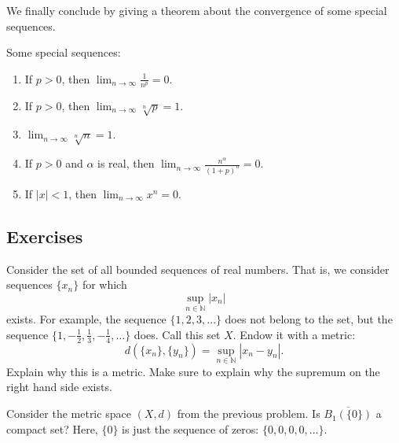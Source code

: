   We finally conclude by giving a theorem about the convergence of some special sequences. 

  \begin{theorem}
    Some special sequences: 
    \begin{enumerate}
      \item If $p > 0$, then $\lim_{n \rightarrow \infty} \frac{1}{n^p} = 0$. 
      
      \item If $p > 0$, then $\lim_{n \rightarrow \infty} \sqrt[n]{p} = 1$. 

      \item $\lim_{n \rightarrow \infty} \sqrt[n]{n} = 1$. 

      \item If $p > 0$ and $\alpha$ is real, then $\lim_{n \rightarrow \infty} \frac{n^\alpha}{(1 + p)^n} = 0$. 
      
      \item If $|x| < 1$, then $\lim_{n \rightarrow \infty} x^n = 0$. 
    \end{enumerate}
  \end{theorem}

\subsection{Exercises}

  \begin{exercise}
    Consider the set of all bounded sequences of real numbers. That is, we
    consider sequences $\{x_n\}$ for which
    \begin{equation}
      \sup_{n\in\mathbb{N}} |x_n|
    \end{equation}
    exists. For example, the sequence $\{1,2,3,\ldots\}$ does not belong to the set,
    but the sequence $\{1,-\frac{1}{2},\frac{1}{3},-\frac{1}{4},\ldots\}$ does. Call this set $X$. Endow it with
    a metric:
    \begin{equation}
      d(\{x_n\},\{y_n\}) = \sup_{n\in\mathbb{N}} |x_n - y_n|.
    \end{equation}
    Explain why this is a metric. Make sure to explain why the supremum on
    the right hand side exists.
  \end{exercise}

  \begin{exercise}
    Consider the metric space $(X,d)$ from the previous problem. Is $\overline{B_1(\{0\})}$
    a compact set? Here, $\{0\}$ is just the sequence of zeros: $\{0,0,0,0,\ldots\}$.
  \end{exercise}
  
